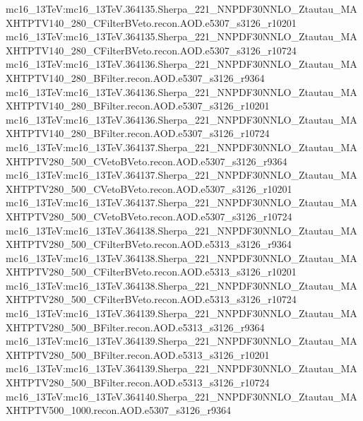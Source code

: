 { mc16\_13TeV:mc16\_13TeV.364135.Sherpa\_221\_NNPDF30NNLO\_Ztautau\_MAXHTPTV140\_280\_CFilterBVeto.recon.AOD.e5307\_s3126\_r10201 \newline  
 mc16\_13TeV:mc16\_13TeV.364135.Sherpa\_221\_NNPDF30NNLO\_Ztautau\_MAXHTPTV140\_280\_CFilterBVeto.recon.AOD.e5307\_s3126\_r10724 \newline  
 mc16\_13TeV:mc16\_13TeV.364136.Sherpa\_221\_NNPDF30NNLO\_Ztautau\_MAXHTPTV140\_280\_BFilter.recon.AOD.e5307\_s3126\_r9364 \newline  
 mc16\_13TeV:mc16\_13TeV.364136.Sherpa\_221\_NNPDF30NNLO\_Ztautau\_MAXHTPTV140\_280\_BFilter.recon.AOD.e5307\_s3126\_r10201 \newline  
 mc16\_13TeV:mc16\_13TeV.364136.Sherpa\_221\_NNPDF30NNLO\_Ztautau\_MAXHTPTV140\_280\_BFilter.recon.AOD.e5307\_s3126\_r10724 \newline  
 mc16\_13TeV:mc16\_13TeV.364137.Sherpa\_221\_NNPDF30NNLO\_Ztautau\_MAXHTPTV280\_500\_CVetoBVeto.recon.AOD.e5307\_s3126\_r9364   \newline
 mc16\_13TeV:mc16\_13TeV.364137.Sherpa\_221\_NNPDF30NNLO\_Ztautau\_MAXHTPTV280\_500\_CVetoBVeto.recon.AOD.e5307\_s3126\_r10201 \newline  
 mc16\_13TeV:mc16\_13TeV.364137.Sherpa\_221\_NNPDF30NNLO\_Ztautau\_MAXHTPTV280\_500\_CVetoBVeto.recon.AOD.e5307\_s3126\_r10724 \newline  
 mc16\_13TeV:mc16\_13TeV.364138.Sherpa\_221\_NNPDF30NNLO\_Ztautau\_MAXHTPTV280\_500\_CFilterBVeto.recon.AOD.e5313\_s3126\_r9364 \newline  
 mc16\_13TeV:mc16\_13TeV.364138.Sherpa\_221\_NNPDF30NNLO\_Ztautau\_MAXHTPTV280\_500\_CFilterBVeto.recon.AOD.e5313\_s3126\_r10201 \newline  
 mc16\_13TeV:mc16\_13TeV.364138.Sherpa\_221\_NNPDF30NNLO\_Ztautau\_MAXHTPTV280\_500\_CFilterBVeto.recon.AOD.e5313\_s3126\_r10724  \newline 
 mc16\_13TeV:mc16\_13TeV.364139.Sherpa\_221\_NNPDF30NNLO\_Ztautau\_MAXHTPTV280\_500\_BFilter.recon.AOD.e5313\_s3126\_r9364\newline   
 mc16\_13TeV:mc16\_13TeV.364139.Sherpa\_221\_NNPDF30NNLO\_Ztautau\_MAXHTPTV280\_500\_BFilter.recon.AOD.e5313\_s3126\_r10201\newline   
 mc16\_13TeV:mc16\_13TeV.364139.Sherpa\_221\_NNPDF30NNLO\_Ztautau\_MAXHTPTV280\_500\_BFilter.recon.AOD.e5313\_s3126\_r10724 \newline  
 mc16\_13TeV:mc16\_13TeV.364140.Sherpa\_221\_NNPDF30NNLO\_Ztautau\_MAXHTPTV500\_1000.recon.AOD.e5307\_s3126\_r9364 \newline  
}
